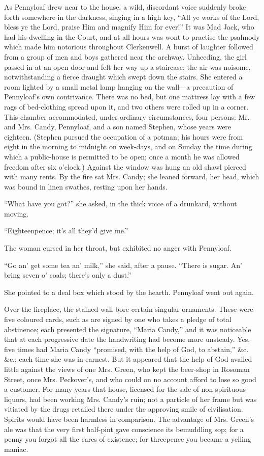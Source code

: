 As Pennyloaf drew near to the house, a wild, discordant voice suddenly
broke forth somewhere in the darkness, singing in a high key, ``All ye
works of the Lord, bless ye the Lord, praise Him and magnify Him for
ever!'' It was Mad Jack, who had his dwelling in the Court, and at all
hours was wont to practise the psalmody which made him notorious
throughout Clerkenwell. A burst of laughter followed from a group of men
and boys gathered near the archway. Unheeding, {}the girl passed in at
an open door and felt her way up a staircase; the air was noisome,
notwithstanding a fierce draught which swept down the stairs. She
entered a room lighted by a small metal lamp hanging on the wall---a
precaution of Pennyloaf's own contrivance. There was no bed, but one
mattress lay with a few rags of bed-clothing spread upon it, and two
others were rolled up in a corner. This chamber accommodated, under
ordinary circumstances, four persons: Mr. and Mrs. Candy, Pennyloaf, and
a son named Stephen, whose years were eighteen. (Stephen pursued the
occupation of a potman; his hours were from eight in the morning to
midnight on week-days, and on Sunday the time during which a
public-house is permitted to be open; once a month he was allowed
freedom after six o'clock.) Against the window was hung an old shawl
pierced with many rents. By the fire sat Mrs. Candy; she leaned forward,
her head, which was bound in linen swathes, resting upon her hands.

``What have you got?'' she asked, in {}the thick voice of a drunkard,
without moving.

``Eighteenpence; it's all they'd give me.''

The woman cursed in her throat, but exhibited no anger with Pennyloaf.

``Go an' get some tea an' milk,'' she said, after a pause. ``There is
sugar. An' bring seven o' coals; there's only a dust.''

She pointed to a deal box which stood by the hearth. Pennyloaf went out
again.

Over the fireplace, the stained wall bore certain singular ornaments.
These were five coloured cards, such as are signed by one who takes a
pledge of total abstinence; each presented the signature, ``Maria
Candy,'' and it was noticeable that at each progressive date the
handwriting had become more unsteady. Yes, five times had Maria Candy
``promised, with the help of God, to abstain,'' \&c. \&c.; each time she
was in earnest. But it appeared that the help of God availed little
against the views of one Mrs. Green, who kept the beer-shop in Rosoman
Street, once Mrs. Peckover's, and who could on no account {}afford to
lose so good a customer. For many years that house, licensed for the
sale of non-spirituous liquors, had been working Mrs. Candy's ruin; not
a particle of her frame but was vitiated by the drugs retailed there
under the approving smile of civilisation. Spirits would have been
harmless in comparison. The advantage of Mrs. Green's ale was that the
very first half-pint gave conscience its bemuddling sop; for a penny you
forgot all the cares of existence; for threepence you became a yelling
maniac.

